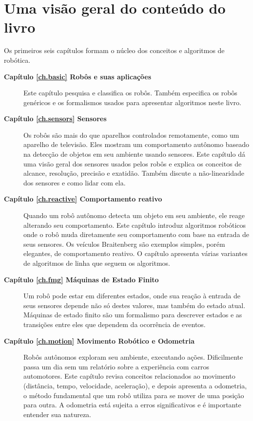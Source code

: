 \section{Uma visão geral do conteúdo do livro}\label{s.overview}

Os primeiros seis capítulos formam o núcleo dos conceitos e algoritmos de robótica.
\begin{description}
\item [\textbf{Capítulo \ref{ch.basic} Robôs e suas aplicações}] Este capítulo pesquisa e classifica os robôs. Também especifica os robôs genéricos e os formalismos usados para apresentar algoritmos neste livro.
\smallskip
\item [\textbf{Capítulo \ref{ch.sensors} Sensores}] Os robôs são mais do que aparelhos controlados remotamente, como um aparelho de televisão. Eles mostram um comportamento autônomo baseado na detecção de objetos em seu ambiente usando sensores. Este capítulo dá uma visão geral dos sensores usados pelos robôs e explica os conceitos de alcance, resolução, precisão e exatidão. Também discute a não-linearidade dos sensores e como lidar com ela.
\smallskip
\item [\textbf{Capítulo \ref{ch.reactive} Comportamento reativo}] Quando um robô autônomo detecta um objeto em seu ambiente, ele reage alterando seu comportamento. Este capítulo introduz algoritmos robóticos onde o robô muda diretamente seu comportamento com base na entrada de seus sensores. Os veículos Braitenberg são exemplos simples, porém elegantes, de comportamento reativo. O capítulo apresenta várias variantes de algoritmos de linha que seguem os algoritmos.
\smallskip
\item [\textbf{Capítulo \ref{ch.fmg} Máquinas de Estado Finito}] Um robô pode estar em diferentes estados, onde sua reação à entrada de seus sensores depende não só destes valores, mas também do estado atual. Máquinas de estado finito são um formalismo para descrever estados e as transições entre eles que dependem da ocorrência de eventos.
\smallskip
\item [\textbf{Capítulo \ref{ch.motion} Movimento Robótico e Odometria}] Robôs autônomos exploram seu ambiente, executando ações. Dificilmente passa um dia sem um relatório sobre a experiência com carros automotores. Este capítulo revisa conceitos relacionados ao movimento (distância, tempo, velocidade, aceleração), e depois apresenta a odometria, o método fundamental que um robô utiliza para se mover de uma posição para outra. A odometria está sujeita a erros significativos e é importante entender sua natureza.


\end{description}
